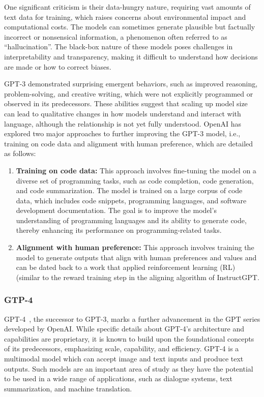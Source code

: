 One significant criticism is their data-hungry nature, requiring vast amounts of text data for training, which raises concerns about environmental impact and computational costs.
The models can sometimes generate plausible but factually incorrect or nonsensical information, a phenomenon often referred to as \enquote{hallucination}.
The black-box nature of these models poses challenges in interpretability and transparency, making it difficult to understand how decisions are made or how to correct biases.

GPT-3 demonstrated surprising emergent behaviors, such as improved reasoning, problem-solving, and creative writing, which were not explicitly programmed or observed in its predecessors.
These abilities suggest that scaling up model size can lead to qualitative changes in how models understand and interact with language, although the relationship is not yet fully understood.
OpenAI has explored two major approaches to further improving the GPT-3 model, i.e., training on code data and alignment with human preference, which are detailed as follows:
\begin{enumerate}
	\item \textbf{Training on code data:} {
		      This approach involves fine-tuning the model on a diverse set of programming tasks, such as code completion, code generation, and code summarization.
		      The model is trained on a large corpus of code data, which includes code snippets, programming languages, and software development documentation.
		      The goal is to improve the model's understanding of programming languages and its ability to generate code, thereby enhancing its performance on programming-related tasks.
	      }
	\item \textbf{Alignment with human preference:} {
	      This approach involves training the model to generate outputs that align with human preferences and values and can be dated back to a work that applied reinforcement learning (RL) \textcite{christiano2017deep} (similar to the reward training step in the aligning algorithm of InstructGPT.
	      }
\end{enumerate}

\subsubsection{GTP-4}
\label{subsubsec:gpt-4}

GPT-4~\cite{openai2024gpt4}, the successor to GPT-3, marks a further advancement in the GPT series developed by OpenAI. While specific details about GPT-4's architecture and capabilities are proprietary, it is known to build upon the foundational concepts of its predecessors, emphasizing scale, capability, and efficiency.
GPT-4 is a multimodal model which can accept image and text inputs and produce text outputs.
Such models are an important area of study as they have the potential to be used in a wide range of applications, such as dialogue systems, text summarization, and machine translation.

